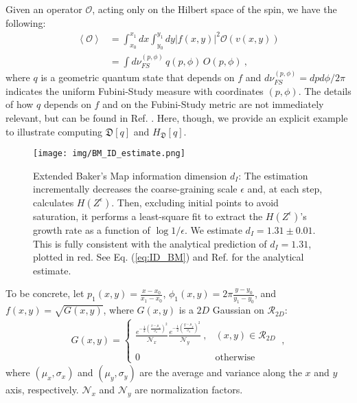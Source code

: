 \documentclass[draft,nofootinbib,pre,twocolumn,showkeys,superscriptaddress,preprintnumbers,floatfix]{revtex4-1}
\newcommand{\1}{\mathbbm{1}}
\newcommand{\MV}[1]{\left\langle #1 \right\rangle}
\newcommand{\DD}{\mathfrak{D}}
\begin{document}
Given an operator $\mathcal{O}$, acting only on the Hilbert space of the spin,
we have the following:
\begin{align}
\MV{\mathcal{O}} & = \int_{x_0}^{x_1} \!\!\! dx \int_{y_0}^{y_1} \!\!\!dy
  |f(x,y)|^2 \mathcal{O}(v(x,y)) \nonumber \\
  & = \int d\nu_{FS}^{(p,\phi)} \, q(p,\phi) \, O(p,\phi)
   ~,
\label{eq:integral}
\end{align}
where $q$ is a geometric quantum state that depends on $f$ and
$d\nu_{FS}^{(p,\phi)} = dp d\phi / 2\pi$ indicates the uniform Fubini-Study
measure with coordinates $(p,\phi)$. The details of how $q$ depends on $f$ and
on the Fubini-Study metric are not immediately relevant, but can be found in
Ref. \cite{Anza20a}. Here, though, we provide an explicit example to illustrate
computing $\mathfrak{D}[q]$ and $H_{\DD}[q]$.

\begin{figure}
\texttt{[image: img/BM\_ID\_estimate.png]}
\caption{Extended Baker's Map information dimension $d_I$: The estimation
	incrementally decreases the coarse-graining scale $\epsilon$ and, at each
	step, calculates $H(Z^\epsilon)$. Then, excluding initial points to avoid
	saturation, it performs a least-square fit to extract the $H(Z^\epsilon)$'s
	growth rate as a function of $\log1/\epsilon$. We estimate $d_I = 1.31 \pm
	0.01$. This is fully consistent with the analytical prediction of $d_I =
	1.31$, plotted in red. See Eq.  (\ref{eq:ID_BM}) and Ref. \cite{Farm83} for
	the analytical estimate.
	}
\label{fig:BM_ID} 
\end{figure}

To be concrete, let $p_1(x,y) = \frac{x-x_0}{x_1-x_0}$, $\phi_1(x,y)
= 2\pi\frac{y-y_0}{y_1-y_0}$, and $f(x,y) = \sqrt{G(x,y)}$, where $G(x,y)$ is a
$2D$ Gaussian on $\mathcal{R}_{2D}$:
\begin{align*}
G(x,y) = \left\{ \begin{array}{ll} 
	\frac{e^{-\frac{1}{2}\left( \frac{x-\mu_x}{\sigma_x}\right)^2}}{\mathcal{N}_x} \frac{e^{-\frac{1}{2}\left( \frac{y-\mu_y}{\sigma_y}\right)^2}}{\mathcal{N}_y}~, & (x,y) \in \mathcal{R}_{2D} \\
	& \\
	0 & \textrm{otherwise}
	\end{array} \right.
  ~,
\end{align*}
where $(\mu_x,\sigma_x)$ and $(\mu_y,\sigma_y)$ are the average and variance
along the $x$ and $y$ axis, respectively. $\mathcal{N}_x$ and $\mathcal{N}_y$
are normalization factors.
\end{document}
